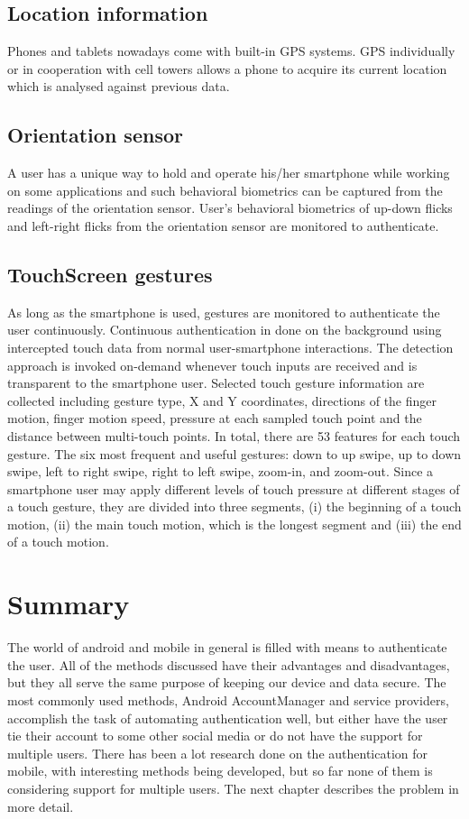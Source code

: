 \subsection{Location information}
Phones and tablets nowadays come with built-in GPS systems. GPS individually or in cooperation with cell towers allows a phone to acquire its current location which is analysed against previous data.  \cite{takamizawa2012authentication}

\subsection{Orientation sensor}
A user has a unique way to hold and operate his/her smartphone while working on some applications and such behavioral biometrics can be captured from the readings of the orientation sensor. User's behavioral biometrics of up-down flicks and left-right flicks from the orientation sensor are monitored to authenticate. \citep{lin2012new}

\subsection{TouchScreen gestures}
As long as the smartphone is used, gestures are monitored to authenticate the user continuously.
Continuous authentication in done on the background using intercepted touch data from
normal user-smartphone interactions. The detection approach is invoked on-demand whenever touch inputs are received and is transparent to the smartphone user. Selected touch gesture information are collected including gesture type, X and Y coordinates, directions of the finger motion, finger motion speed, pressure at each sampled touch point and the distance between multi-touch points. In total, there are 53 features for each touch gesture. The six most frequent and useful gestures: down to up swipe, up to down swipe, left to right swipe, right to left swipe, zoom-in, and zoom-out. Since a smartphone user may apply different levels of touch pressure at different stages of a touch gesture, they are divided into three segments, (i) the
beginning of a touch motion, (ii) the main touch motion, which
is the longest segment and (iii) the end of a touch motion. \cite{feng2012continuous, li2013unobservable}

\section{Summary}
The world of android and mobile in general is filled with means to authenticate the user. All of the methods discussed have their advantages and disadvantages, but they all serve the same purpose of keeping our device and data secure. The most commonly used methods, Android AccountManager and service providers, accomplish the task of automating authentication well, but either have the user tie their account to some other social media or do not have the support for multiple users. There has been a lot research done on the authentication for mobile, with interesting methods being developed, but so far none of them is considering support for multiple users. The next chapter describes the problem in more detail.



